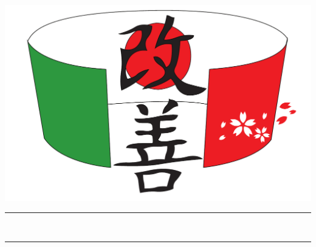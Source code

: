 \begin{titlepage}
  \begin{center}
    {\fontsize{2 cm}{1em}\selectfont \groupname} \\ [3 cm]
    \includegraphics[scale=0.6]{Pics/logo} \\ [4 cm]

    \hrule
    \vspace{2 mm}
    \Huge{\projectname} \\
    \Large{\doctitle}
    \vspace{2 mm}
    \hrule

  \end{center}
\end{titlepage}